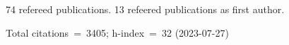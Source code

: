 74 refereed publications. 13 refeered publications as first author.

Total citations~=~3405; h-index~=~32 (2023-07-27)